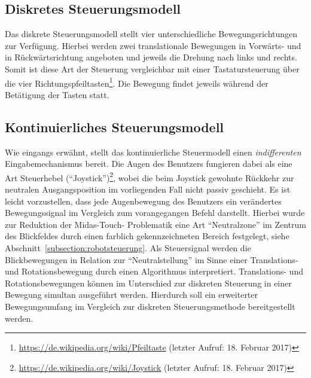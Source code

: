 \subsection{Diskretes Steuerungsmodell}
Das diskrete Steuerungsmodell stellt vier unterschiedliche Bewegungsrichtungen zur Verfügung. Hierbei werden zwei translationale Bewegungen in Vorwärts- und in Rückwärtsrichtung angeboten und jeweils die Drehung nach links und rechts. Somit ist diese Art der Steuerung vergleichbar mit einer Tastatursteuerung über die vier Richtungspfeiltasten\footnote{\url{https://de.wikipedia.org/wiki/Pfeiltaste} (letzter Aufruf: 18. Februar 2017)}. Die Bewegung findet jeweils während der Betätigung der Tasten statt. 

\subsection{Kontinuierliches Steuerungsmodell}
Wie eingangs erwähnt, stellt das kontinuierliche Steuermodell einen \textit{indifferenten} Eingabemechanismus bereit. Die Augen des Benutzers fungieren dabei als eine Art Steuerhebel (\enquote{Joystick})\footnote{\url{https://de.wikipedia.org/wiki/Joystick} (letzter Aufruf: 18. Februar 2017)}, wobei die beim Joystick gewohnte Rückkehr zur neutralen Ausgangsposition im vorliegenden Fall nicht passiv geschieht. Es ist leicht vorzustellen, dass jede Augenbewegung des Benutzers ein verändertes Bewegungssignal im Vergleich zum vorangegangen Befehl darstellt. Hierbei wurde zur Reduktion der Midas-Touch- Problematik eine Art \enquote{Neutralzone} im Zentrum des Blickfeldes durch einen farblich gekennzeichneten Bereich festgelegt, siehe Abschnitt~\ref{subsection:robotsteuerung}. Als Steuersignal werden die Blickbewegungen in Relation zur \enquote{Neutralstellung} im Sinne einer Translations- und Rotationsbewegung durch einen Algorithmus interpretiert. Translations- und Rotationsbewegungen können im Unterschied zur diskreten Steuerung in einer Bewegung simultan ausgeführt werden. Hierdurch soll ein erweiterter Bewegungsumfang im Vergleich zur diskreten Steuerungsmethode bereitgestellt werden.

